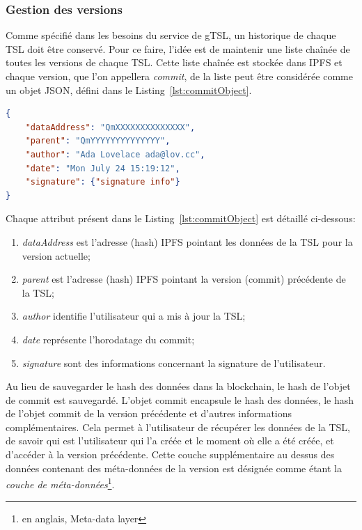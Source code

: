\documentclass{tnreport}
\begin{document}
\subsubsection{Gestion des versions}

Comme spécifié dans les besoins du service de gTSL, un historique de chaque TSL doit être conservé. 
Pour ce faire, l'idée est de maintenir une liste chaînée de toutes les versions de chaque TSL.
Cette liste chaînée est stockée dans IPFS et chaque version, que l'on appellera {\em commit}, de la liste peut être considérée comme un objet JSON, défini dans le Listing~\ref{lst:commitObject}.

\begin{lstlisting}[language=json, basicstyle=\small, caption={Commit Object}, label={lst:commitObject}]
{
	"dataAddress": "QmXXXXXXXXXXXXXX",
	"parent": "QmYYYYYYYYYYYYYY",
	"author": "Ada Lovelace ada@lov.cc",
	"date": "Mon July 24 15:19:12",
	"signature": {"signature info"}
}
\end{lstlisting}

Chaque attribut présent dans le Listing~\ref{lst:commitObject} est détaillé ci-dessous:
\begin{enumerate}
	\item \textit{dataAddress} est l'adresse (hash) IPFS pointant les données de la TSL pour la version actuelle;
	\item \textit{parent} est l'adresse (hash) IPFS pointant la version (commit) précédente de la TSL;
	\item \textit{author} identifie l'utilisateur qui a mis à jour la TSL;
	\item \textit{date} représente l'horodatage du commit;
	\item \textit{signature} sont des informations concernant la signature de l'utilisateur.
\end{enumerate}

Au lieu de sauvegarder le hash des données dans la blockchain, le hash de l'objet de commit est sauvegardé. L'objet commit encapsule le hash des données, le hash de l'objet commit de la version précédente et d'autres informations complémentaires. 
Cela permet à l'utilisateur de récupérer les données de la TSL, de savoir qui est l'utilisateur qui l'a créée et le moment où elle a été créée, et d'accéder à la version précédente. 
Cette couche supplémentaire au dessus des données contenant des méta-données de la version est désignée comme étant la {\em couche de méta-données}\footnote{en anglais, Meta-data layer}.
\end{document}
